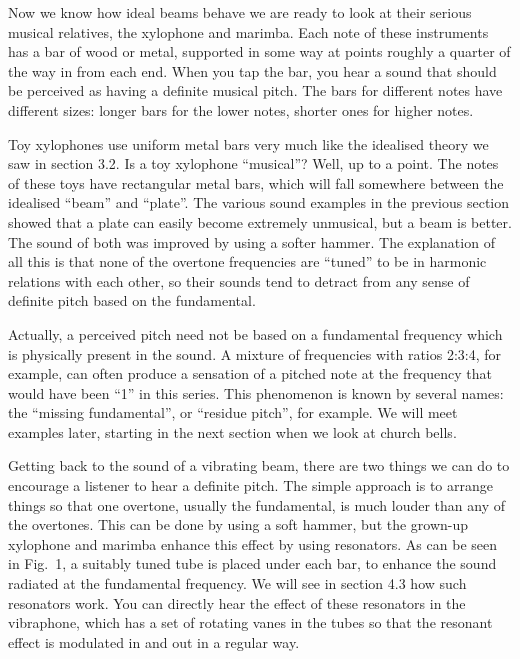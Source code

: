 

  Now we know how ideal beams behave we are ready to look at their serious 
  musical relatives, the xylophone and marimba. Each note of these instruments 
  has a bar of wood or metal, supported in some way at points roughly a quarter 
  of the way in from each end. When you tap the bar, you hear a sound that 
  should be perceived as having a definite musical pitch. The bars for 
  different notes have different sizes: longer bars for the lower notes, 
  shorter ones for higher notes. 

  Toy xylophones use uniform metal bars very much like the idealised theory we 
  saw in section 3.2. Is a toy xylophone ``musical''? Well, up to a point. The 
  notes of these toys have rectangular metal bars, which will fall somewhere 
  between the idealised ``beam'' and ``plate''. The various sound examples in 
  the previous section showed that a plate can easily become extremely 
  unmusical, but a beam is better. The sound of both was improved by using a 
  softer hammer. The explanation of all this is that none of the overtone 
  frequencies are ``tuned'' to be in harmonic relations with each other, so 
  their sounds tend to detract from any sense of definite pitch based on the 
  fundamental. 

  Actually, a perceived pitch need not be based on a fundamental frequency 
  which is physically present in the sound. A mixture of frequencies with 
  ratios 2:3:4, for example, can often produce a sensation of a pitched note at 
  the frequency that would have been ``1'' in this series. This phenomenon is 
  known by several names: the ``missing fundamental'', or ``residue pitch'', 
  for example. We will meet examples later, starting in the next section when 
  we look at church bells. 

  Getting back to the sound of a vibrating beam, there are two things we can do 
  to encourage a listener to hear a definite pitch. The simple approach is to 
  arrange things so that one overtone, usually the fundamental, is much louder 
  than any of the overtones. This can be done by using a soft hammer, but the 
  grown-up xylophone and marimba enhance this effect by using resonators. As 
  can be seen in Fig.\ 1, a suitably tuned tube is placed under each bar, to 
  enhance the sound radiated at the fundamental frequency. We will see in 
  section 4.3 how such resonators work. You can directly hear the effect of 
  these resonators in the vibraphone, which has a set of rotating vanes in the 
  tubes so that the resonant effect is modulated in and out in a regular way. 

